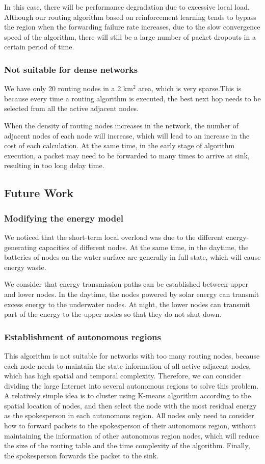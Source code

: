 \documentclass[10pt,twocolumn,letterpaper]{article}
\begin{document}
	In this case, there will be performance degradation due to excessive local load. Although our routing algorithm based on reinforcement learning tends to bypass the region when the forwarding failure rate increases, due to the slow convergence speed of the algorithm, there will still be a large number of packet dropouts in a certain period of time.
\subsubsection{Not suitable for dense networks}
	We have only 20 routing nodes in a 2 km$^2$ area, which is very sparse.This is because every time a routing algorithm is executed, the best next hop needs to be selected from all the active adjacent nodes. 
	
	When the density of routing nodes increases in the network, the number of adjacent nodes of each node will increase, which will lead to an increase in the cost of each calculation. At the same time, in the early stage of algorithm execution, a packet may need to be forwarded to many times to arrive at sink, resulting in too long delay time.
\subsection{Future Work}
\subsubsection{Modifying the energy model}
	We noticed that the short-term local overload was due to the different energy-generating capacities of different nodes. At the same time, in the daytime, the batteries of nodes on the water surface are generally in full state, which will cause energy waste.
	
	We consider that energy transmission paths can be established between upper and lower nodes. In the daytime, the nodes powered by solar energy can transmit excess energy to the underwater nodes. At night, the lower nodes can transmit part of the energy to the upper nodes so that they do not shut down.
\subsubsection{Establishment of autonomous regions}
	This algorithm is not suitable for networks with too many routing nodes, because each node needs to maintain the state information of all active adjacent nodes, which has high spatial and temporal complexity. Therefore, we can consider dividing the large Internet into several autonomous regions to solve this problem.
	A relatively simple idea is to cluster using K-means algorithm according to the spatial location of nodes, and then select the node with the most residual energy as the spokesperson in each autonomous region. All nodes only need to consider how to forward packets to the spokesperson of their autonomous region, without maintaining the information of other autonomous region nodes, which will reduce the size of the routing table and the time complexity of the algorithm. Finally, the spokesperson forwards the packet to the sink.
{\small
	
	
}
\end{document}
